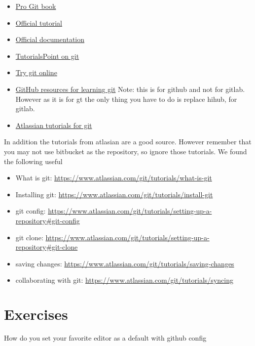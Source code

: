 \begin{itemize}
\item
  \href{https://git-scm.com/book/en/v2}{Pro Git book}
\item
  \href{https://git-scm.com/docs/gittutorial}{Official tutorial}
\item
  \href{https://git-scm.com/doc}{Official documentation}
\item
  \href{http://www.tutorialspoint.com/git/}{TutorialsPoint on git}
\item
  \href{https://try.github.io}{Try git online}
\item
  \href{https://help.github.com/articles/good-resources-for-learning-git-and-github/}{GitHub
  resources for learning git} Note: this is for github and not for
  gitlab. However as it is for gt the only thing you have to do is
  replace hihub, for gitlab.
\item
  \href{https://www.atlassian.com/git/tutorials/}{Atlassian tutorials
  for git}
\end{itemize}

In addition the tutorials from atlasian are a good source. However
remember that you may not use bitbucket as the repository, so ignore
those tutorials. We found the following useful

\begin{itemize}
\item
  What is git: \url{https://www.atlassian.com/git/tutorials/what-is-git}
\item
  Installing git:
  \url{https://www.atlassian.com/git/tutorials/install-git}
\item
  git config:
  \url{https://www.atlassian.com/git/tutorials/setting-up-a-repository\#git-config}
\item
  git clone:
  \url{https://www.atlassian.com/git/tutorials/setting-up-a-repository\#git-clone}
\item
  saving changes:
  \url{https://www.atlassian.com/git/tutorials/saving-changes}
\item
  collaborating with git:
  \url{https://www.atlassian.com/git/tutorials/syncing}
\end{itemize}


\section{Exercises}

\begin{exercise}
\label{E:Github.1} How do you set your favorite editor as a default with
  github config
\end{exercise}

